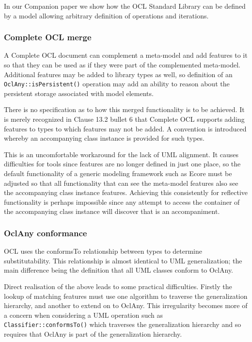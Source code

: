 \documentclass{eceasst}
\begin{document}
In our Companion paper\cite{OCLstdlib} we show how the OCL Standard Library can be defined by a model allowing arbitrary definition of operations and iterations.

\subsubsection{Complete OCL merge}

A Complete OCL document can complement a meta-model and add features to it so that they can be used as if they were part of the complemented meta-model. Additional features may be added to library types as well, so definition of an \verb|OclAny::isPersistent()| operation may add an ability to reason about the persistent storage associated with model elements.

There is no specification as to how this merged functionality is to be achieved. It is merely recognized in Clause 13.2 bullet 6 that Complete OCL supports adding features to types to which features may not be added. A convention is introduced whereby an accompanying class instance is provided for such types.

This is an uncomfortable workaround for the lack of UML alignment. It causes difficulties for tools since features are no longer defined in just one place, so the default functionality of a generic modeling framework such as Ecore must be adjusted so that all functionality that can see the meta-model features also see the accompanying class instance features. Achieving this consistently for reflective functionality is perhaps impossible since any attempt to access the container of the accompanying class instance will discover that is  an accompaniment.    

\subsubsection{OclAny conformance}

OCL uses the conformsTo relationship between types to determine substitutability. This relationship is almost identical to UML generalization; the main difference being the definition that all UML classes conform to OclAny.

Direct realisation of the above leads to some practical difficulties. Firstly the lookup of matching features must use one algorithm to traverse the generalization hierarchy, and another to extend on to OclAny. This irregularity becomes more of a concern when considering a UML operation such as \verb|Classifier::conformsTo()| which traverses the generalization hierarchy and so requires that OclAny is part of the generalization hierarchy.
\end{document}
